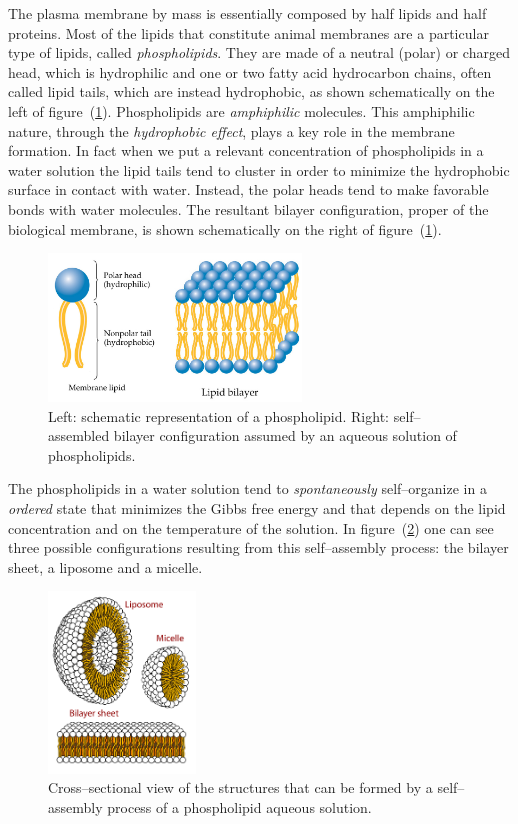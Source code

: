 The plasma membrane by mass is essentially composed by half lipids and half proteins. Most of the lipids that constitute animal membranes are a particular type of lipids, called \textit{phospholipids}. They are made of a neutral (polar) or charged head, which is hydrophilic and one or two fatty acid hydrocarbon chains, often called lipid tails, which are instead hydrophobic, as shown schematically on the left of figure~(\ref{fig:phospho}).  Phospholipids are \textit{amphiphilic} molecules. This amphiphilic nature, through the \textit{hydrophobic effect}, plays a key role in the membrane formation. In fact when we put a relevant concentration of phospholipids in a water solution the lipid tails tend to cluster in order to minimize the hydrophobic surface in contact with water. Instead, the polar heads tend to make favorable bonds with water molecules. The resultant bilayer configuration, proper of the biological membrane, is shown schematically on the right of figure~(\ref{fig:phospho}).
\begin{figure}[!ht]
	\centering
	\includegraphics[width=0.6\textwidth]{./img/phospholipids}
	\caption{Left: schematic representation of a phospholipid. Right: self--assembled bilayer configuration assumed by an aqueous solution of phospholipids.}
	\label{fig:phospho}
\end{figure}
The phospholipids in a water solution tend to \textit{spontaneously} self--organize in a \textit{ordered} state that minimizes the Gibbs free energy and that depends on the lipid concentration and on the temperature of the solution. In figure~(\ref{fig:lipidsStructures}) one can see three possible configurations resulting from this self--assembly process: the bilayer sheet, a liposome and a micelle.
\begin{figure}
	\centering
	\includegraphics[width=0.35\textwidth]{./img/lipidsStructures}
	\caption{Cross--sectional view of the structures that can be formed by a self--assembly process of a phospholipid aqueous solution.}
	\label{fig:lipidsStructures}
\end{figure}

